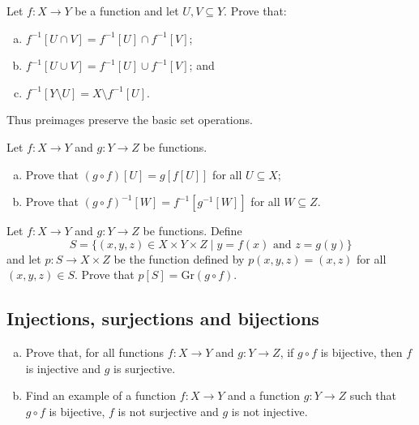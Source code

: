 \begin{chapex}
Let $f : X \to Y$ be a function and let $U, V \subseteq Y$. Prove that:
\begin{enumerate}[(a)]
\item $f^{-1}[U \cap V] = f^{-1}[U] \cap f^{-1}[V]$;
\item $f^{-1}[U \cup V] = f^{-1}[U] \cup f^{-1}[V]$; and
\item $f^{-1}[Y \setminus U] = X \setminus f^{-1}[U]$.
\end{enumerate}
Thus preimages preserve the basic set operations.
\end{chapex}

\begin{chapex}
Let $f : X \to Y$ and $g : Y \to Z$ be functions.
\begin{enumerate}[(a)]
\item Prove that $(g \circ f)[U] = g[f[U]]$ for all $U \subseteq X$;
\item Prove that $(g \circ f)^{-1}[W] = f^{-1}[g^{-1}[W]]$ for all $W \subseteq Z$.
\end{enumerate}
\end{chapex}

\begin{chapex}
Let $f : X \to Y$ and $g : Y \to Z$ be functions. Define
\[ S = \{ (x,y,z) \in X \times Y \times Z \mid y=f(x) \text{ and } z=g(y) \} \]
and let $p : S \to X \times Z$ be the function defined by $p(x,y,z) = (x,z)$ for all $(x,y,z) \in S$. Prove that $p[S]=\mathrm{Gr}(g \circ f)$.
\end{chapex}

\subsection*{Injections, surjections and bijections}

\begin{chapex}
\begin{enumerate}[(a)]
\item Prove that, for all functions $f : X \to Y$ and $g : Y \to Z$, if $g \circ f$ is bijective, then $f$ is injective and $g$ is surjective.
\item Find an example of a function $f : X \to Y$ and a function $g : Y \to Z$ such that $g \circ f$ is bijective, $f$ is not surjective and $g$ is not injective.
\end{enumerate}
\end{chapex}

